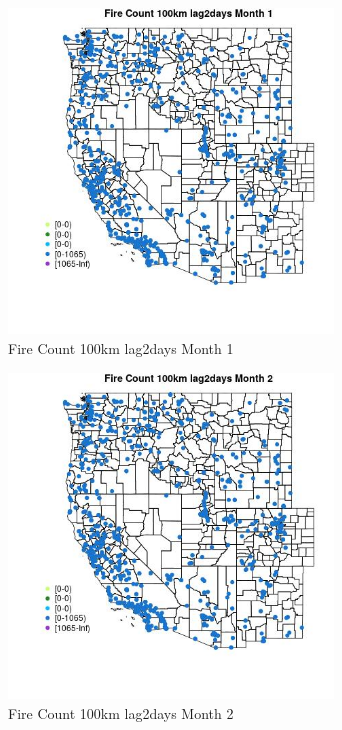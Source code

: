 \begin{figure} 
\centering  
\includegraphics[width=0.77\textwidth]{Code_Outputs/Report_ML_input_PM25_Step4_part_f_de_duplicated_aveswNAs_MapObsMo1Fire_Count_100km_lag2days.jpg} 
\caption{\label{fig:Report_ML_input_PM25_Step4_part_f_de_duplicated_aveswNAsMapObsMo1Fire_Count_100km_lag2days}Fire Count 100km lag2days Month 1} 
\end{figure} 
 

\begin{figure} 
\centering  
\includegraphics[width=0.77\textwidth]{Code_Outputs/Report_ML_input_PM25_Step4_part_f_de_duplicated_aveswNAs_MapObsMo2Fire_Count_100km_lag2days.jpg} 
\caption{\label{fig:Report_ML_input_PM25_Step4_part_f_de_duplicated_aveswNAsMapObsMo2Fire_Count_100km_lag2days}Fire Count 100km lag2days Month 2} 
\end{figure} 
 

